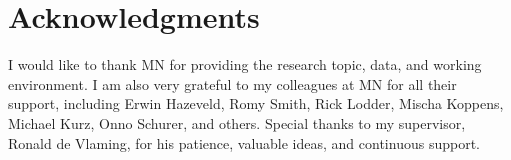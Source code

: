 \chapter*{Acknowledgments}
I would like to thank MN for providing the research topic, data, and working environment. I am also very grateful to my colleagues at MN for all their support, including Erwin Hazeveld, Romy Smith, Rick Lodder, Mischa Koppens, Michael Kurz, Onno Schurer, and others. Special thanks to my supervisor, Ronald de Vlaming, for his patience, valuable ideas, and continuous support.